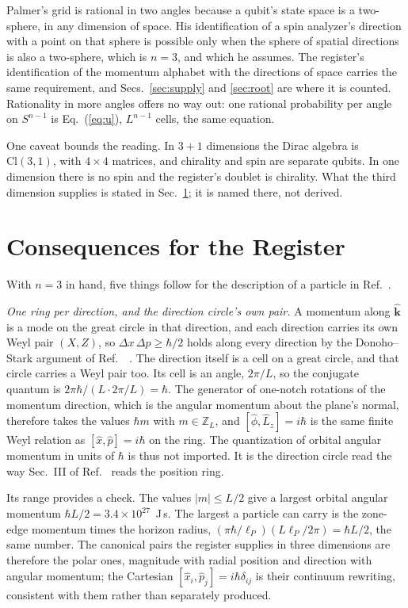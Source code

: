 \documentclass[aps,prd,twocolumn,superscriptaddress,nofootinbib]{revtex4-2}
\begin{document}
Palmer's grid is rational in two angles because a qubit's state space is a two-sphere, in any dimension of space. His identification of a spin analyzer's direction with a point on that sphere is possible only when the sphere of spatial directions is also a two-sphere, which is $n = 3$, and which he assumes. The register's identification of the momentum alphabet with the directions of space carries the same requirement, and Secs.~\ref{sec:supply} and \ref{sec:root} are where it is counted. Rationality in more angles offers no way out: one rational probability per angle on $S^{n-1}$ is Eq.~(\ref{eq:u}), $L^{n-1}$ cells, the same equation.

One caveat bounds the reading. In $3+1$ dimensions the Dirac algebra is $\mathrm{Cl}(3,1)$, with $4\times4$ matrices, and chirality and spin are separate qubits. In one dimension there is no spin and the register's doublet is chirality. What the third dimension supplies is stated in Sec.~\ref{sec:consequences}; it is named there, not derived.

\section{Consequences for the Register}
\label{sec:consequences}

With $n = 3$ in hand, five things follow for the description of a particle in Ref.~\cite{korytko2026c}.

\textit{One ring per direction, and the direction circle's own pair.} A momentum along $\hat{\mathbf{k}}$ is a mode on the great circle in that direction, and each direction carries its own Weyl pair $(X,Z)$, so $\Delta x\,\Delta p \ge \hbar/2$ holds along every direction by the Donoho--Stark argument of Ref.~\cite{korytko2026c}~\cite{donoho1989,massar2008}. The direction itself is a cell on a great circle, and that circle carries a Weyl pair too. Its cell is an angle, $2\pi/L$, so the conjugate quantum is $2\pi\hbar/(L\cdot2\pi/L) = \hbar$. The generator of one-notch rotations of the momentum direction, which is the angular momentum about the plane's normal, therefore takes the values $\hbar m$ with $m\in\mathbb{Z}_L$, and $[\hat\phi,\hat L_z] = i\hbar$ is the same finite Weyl relation as $[\hat x,\hat p] = i\hbar$ on the ring. The quantization of orbital angular momentum in units of $\hbar$ is thus not imported. It is the direction circle read the way Sec.~III of Ref.~\cite{korytko2026c} reads the position ring.

Its range provides a check. The values $|m| \le L/2$ give a largest orbital angular momentum $\hbar L/2 = 3.4\times10^{27}$~J\,s. The largest a particle can carry is the zone-edge momentum times the horizon radius, $(\pi\hbar/\ell_P)(L\ell_P/2\pi) = \hbar L/2$, the same number. The canonical pairs the register supplies in three dimensions are therefore the polar ones, magnitude with radial position and direction with angular momentum; the Cartesian $[\hat x_i,\hat p_j] = i\hbar\delta_{ij}$ is their continuum rewriting, consistent with them rather than separately produced.
\end{document}
